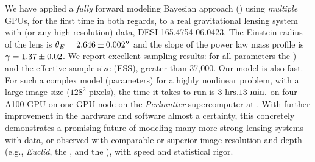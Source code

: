 We have applied a \emph{fully} forward modeling Bayesian approach (\gigal) using \emph{multiple} GPUs, for the first time in both regards, to a real gravitational
lensing system with \hst (or any high resolution) data, DESI-165.4754-06.0423.
The Einstein radius of the lens is $\theta_{E} =2.646\pm0.002^{\prime \prime}$ and the slope of the power law mass profile is $\gamma = 1.37\pm0.02$.
We report excellent sampling results: 
for all parameters 
the )
and the effective sample size (ESS), greater than 37,000.
Our model is also fast.
For such a complex model (\nparams parameters) for a highly nonlinear problem,
with a large \hst image size ($128^2$ pixels),
the time it takes to run \gigal is ${{3~\rm{hrs.} 13~\rm{min.}}}$ on four A100 GPU on one GPU node on the \emph{Perlmutter} supercomputer at . 
With further improvement in the hardware and software almost a certainty, 
this concretely demonstrates a promising future of modeling  many more strong lensing systems with \hst data, or observed with comparable or superior image resolution and depth (e.g.,
\emph{Euclid}, the \JWST, and the \RST), with speed and statistical rigor.

